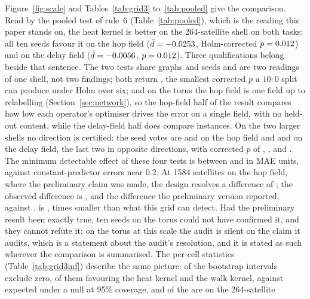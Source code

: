 \documentclass[preprint,11pt,3p]{elsarticle}
\begin{document}
Figure~\ref{fig:scale} and Tables~\ref{tab:grid3} to~\ref{tab:pooled} give the comparison.
Read by the pooled test of rule~6 (Table~\ref{tab:pooled}), which is the reading this paper
stands on, the heat kernel is better on the 264-satellite shell on both tasks: all ten seeds
favour it on the hop field ($\bar d=-0.0253$, Holm-corrected
$p=0.012$) and on the delay field ($\bar d=-0.0056$,
$p=0.012$). Three qualifications belong beside that sentence. The two tests
share graphs and seeds and are two readings of one shell, not two findings; both return
\numPooledMinHolmSix, the smallest corrected $p$ a $10{:}0$ split can produce under Holm over
six; and on the torus the hop field is one field up to relabelling (Section~\ref{sec:network}),
so the hop-field half of the result compares how low each operator's optimiser drives the error
on a single field, with no held-out content, while the delay-field half does compare
instances. On the two larger shells no direction is certified: the seed votes
are \numPooledHopsShellOneWins{} and \numPooledHopsDoubleWins{} on the hop field and
\numPooledDelayShellOneWins{} and \numPooledDelayDoubleWins{} on the delay field, the last two
in opposite directions, with corrected $p$ of \numPooledHopsShellOneHolm{},
\numPooledHopsDoubleHolm{}, \numPooledDelayShellOneHolm{} and \numPooledDelayDoubleHolm{}. The
minimum detectable effect of these four tests is between \numPooledMdeLargeMin{} and
\numPooledMdeMax{} in MAE units, against constant-predictor errors near 0.2. At 1584 satellites
on the hop field, where the preliminary claim was made, the design resolves a difference of
\numPooledHopsShellOneMde{}; the observed difference is \numPooledHopsShellOneD{}, and the
difference the preliminary version reported, \numPrelimWalkMAE{} against \numPrelimHeatMAE{}, is
\numPrelimDiff{}, \numMdeRatioHopsShellOne{} times smaller than what this grid can detect. Had the
preliminary result been exactly true, ten seeds on the torus could not have confirmed it, and
they cannot refute it: on the torus at this scale the audit is silent on the claim it audits,
which is a statement about the audit's resolution, and it is stated as such wherever the
comparison is summarised. The
per-cell statistics (Table~\ref{tab:grid3inf}) describe the same picture: \numCIExclZero{} of the
\numGthreeArmCells{} bootstrap intervals exclude zero, \numCIExclZeroHeat{} of them favouring the
heat kernel and \numCIExclZeroWalk{} the walk kernel, against \numCIExpectedNull{} expected under
a null at 95\% coverage, and \numCIExclZeroSmall{} of the \numCIExclZero{} are on the 264-satellite
\end{document}
